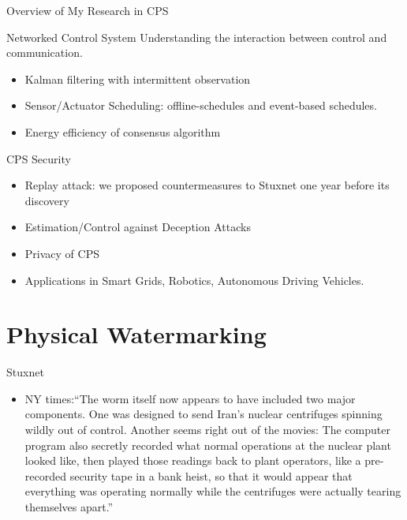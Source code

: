 \documentclass[10pt]{beamer}
\begin{document}
\begin{frame}{Overview of My Research in CPS}
\begin{block}{Networked Control System}
  Understanding the interaction between control and communication.
 \begin{itemize}
  \item Kalman filtering with intermittent observation
  \item Sensor/Actuator Scheduling: offline-schedules and event-based schedules.
  \item Energy efficiency of consensus algorithm
 \end{itemize}
\end{block}
\begin{block}{CPS Security}
\begin{itemize}
  \item Replay attack: we proposed countermeasures to Stuxnet one year before its discovery
  \item Estimation/Control against Deception Attacks
  \item Privacy of CPS
  \item Applications in Smart Grids, Robotics, Autonomous Driving Vehicles.
\end{itemize}
\end{block}
\end{frame}

\section{Physical Watermarking}
\frame{\tableofcontents[currentsection]}

\begin{frame}{Stuxnet}
  \begin{itemize}
    \item NY times:``The worm itself now appears to have included two major components. One was designed to send Iran's nuclear centrifuges spinning wildly out of control. Another seems right out of the movies: The computer program also \alert{secretly recorded what normal operations at the nuclear plant looked like, then played those readings back to plant operators}, like a pre-recorded security tape in a bank heist, so that it would appear that everything was operating normally while the centrifuges were actually tearing themselves apart.''
  \end{itemize}
\end{frame}
\end{document}
